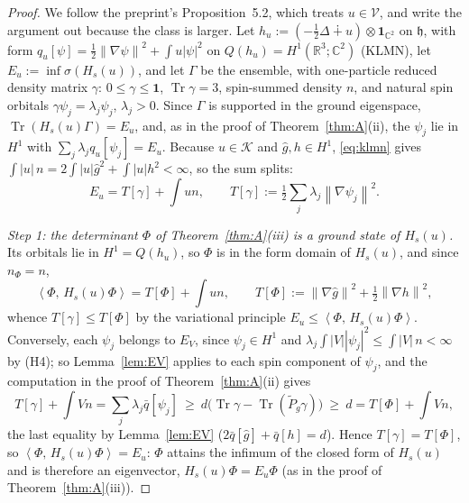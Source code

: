 \documentclass[11pt,a4paper]{article}
\theoremstyle{plain}
\theoremstyle{definition}
\theoremstyle{remark}
\newcommand{\R}{\mathbb{R}}
\newcommand{\C}{\mathbb{C}}
\newcommand{\VV}{\mathcal{V}}
\newcommand{\KK}{\mathcal{K}}
\newcommand{\norm}[1]{\left\|#1\right\|}
\newcommand{\ip}[2]{\left\langle #1,\,#2\right\rangle}
\DeclareMathOperator{\Tr}{Tr}
\newcommand{\hg}{\hat g}
\begin{document}
\begin{proof}
We follow the preprint's Proposition~5.2, which treats $u\in\VV$, and write the argument out because the class is larger. Let $h_u:=(-\tfrac12\Delta\dotplus u)\otimes\mathbf 1_{\C^2}$ on $\mathfrak h$, with form $q_u[\psi]=\tfrac12\norm{\nabla\psi}^2+\int u|\psi|^2$ on $Q(h_u)=H^1(\R^3;\C^2)$ (KLMN), let $E_u:=\inf\sigma(H_s(u))$, and let $\Gamma$ be the ensemble, with one-particle reduced density matrix $\gamma$: $0\le\gamma\le\mathbf 1$, $\Tr\gamma=3$, spin-summed density $n$, and natural spin orbitals $\gamma\psi_j=\lambda_j\psi_j$, $\lambda_j>0$. Since $\Gamma$ is supported in the ground eigenspace, $\Tr(H_s(u)\Gamma)=E_u$, and, as in the proof of Theorem~\ref{thm:A}(ii), the $\psi_j$ lie in $H^1$ with $\sum_j\lambda_jq_u[\psi_j]=E_u$. Because $u\in\KK$ and $\hg,h\in H^1$, \eqref{eq:klmn} gives $\int|u|\,n=2\int|u|\hg^2+\int|u|h^2<\infty$, so the sum splits:
\[
E_u=T[\gamma]+\int un,\qquad T[\gamma]:=\tfrac12\sum_j\lambda_j\norm{\nabla\psi_j}^2 .
\]

\emph{Step 1: the determinant $\Phi$ of Theorem~\ref{thm:A}(iii) is a ground state of $H_s(u)$.} Its orbitals lie in $H^1=Q(h_u)$, so $\Phi$ is in the form domain of $H_s(u)$, and since $n_\Phi=n$,
\[
\ip\Phi{H_s(u)\Phi}=T[\Phi]+\int un,\qquad T[\Phi]:=\norm{\nabla\hg}^2+\tfrac12\norm{\nabla h}^2 ,
\]
whence $T[\gamma]\le T[\Phi]$ by the variational principle $E_u\le\ip\Phi{H_s(u)\Phi}$. Conversely, each $\psi_j$ belongs to $E_V$, since $\psi_j\in H^1$ and $\lambda_j\int|V||\psi_j|^2\le\int|V|\,n<\infty$ by (H4); so Lemma~\ref{lem:EV} applies to each spin component of $\psi_j$, and the computation in the proof of Theorem~\ref{thm:A}(ii) gives
\[
T[\gamma]+\int Vn=\sum_j\lambda_j\bar q[\psi_j]\ \ge\ d\big(\Tr\gamma-\Tr(\tilde P_g\gamma)\big)\ \ge\ d=T[\Phi]+\int Vn ,
\]
the last equality by Lemma~\ref{lem:EV} ($2\bar q[\hg]+\bar q[h]=d$). Hence $T[\gamma]=T[\Phi]$, so $\ip\Phi{H_s(u)\Phi}=E_u$: $\Phi$ attains the infimum of the closed form of $H_s(u)$ and is therefore an eigenvector, $H_s(u)\Phi=E_u\Phi$ (as in the proof of Theorem~\ref{thm:A}(iii)).


\end{proof}
\end{document}
